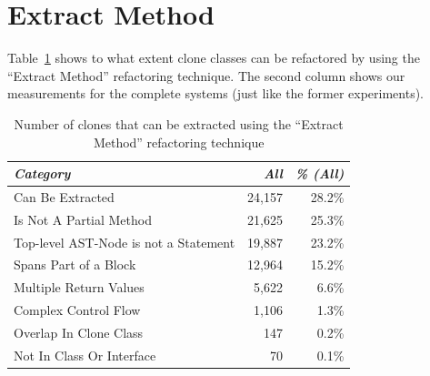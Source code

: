 \section{Extract Method}
Table~\ref{tab:refactorability} shows to what extent clone classes can be refactored by using the ``Extract Method'' refactoring technique. The second column shows our measurements for the complete systems (just like the former experiments).
\begin{table}[H]
\centering
\begin{tabular}{@{}lrr@{}}
\toprule
\textit{\textbf{Category}} & \textit{\textbf{All}} & \textit{\textbf{\% (All)}} \\ \midrule
Can Be Extracted & 24,157 & 28.2\%  \\
Is Not A Partial Method & 21,625 & 25.3\% \\
Top-level AST-Node is not a Statement & 19,887 & 23.2\% \\
Spans Part of a Block & 12,964 & 15.2\%  \\
Multiple Return Values & 5,622 & 6.6\%  \\
Complex Control Flow & 1,106 & 1.3\% \\
Overlap In Clone Class & 147 & 0.2\% \\
Not In Class Or Interface & 70 & 0.1\% \\
\bottomrule
\end{tabular}
\caption{Number of clones that can be extracted using the ``Extract Method'' refactoring technique}
\label{tab:refactorability}
\end{table}


